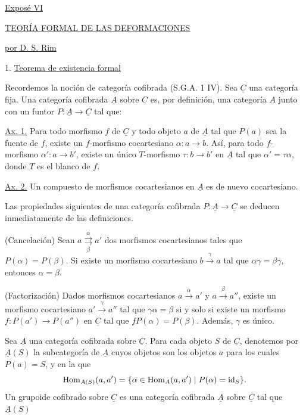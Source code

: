 
\begin{center}
\underline{Expos\'e VI}

\vspace{1em}
\underline{\underline{TEORÍA FORMAL DE LAS DEFORMACIONES}}

\vspace{1em}
\underline{por D. S. Rim}
\end{center}

1. \underline{Teorema de existencia formal}

Recordemos la noción de categoría cofibrada (S.G.A. 1 IV). Sea
$\underline C$ una categoría fija. Una categoría cofibrada $\underline A$
sobre $\underline C$ es, por definición, una categoría $\underline A$
junto con un funtor $P:\underline A\longrightarrow\underline C$ tal que:

\underline{Ax. 1.} Para todo morfismo $f$ de $\underline C$ y todo objeto
$a$ de $\underline A$ tal que $P(a)$ sea la fuente de $f$, existe un
$f$-morfismo cocartesiano $\alpha:a\longrightarrow b$. Así, para todo
$f$-morfismo $\alpha':a\longrightarrow b'$, existe un único
$T$-morfismo $\tau:b\longrightarrow b'$ en $\underline A$ tal que
$\alpha'=\tau\alpha$, donde $T$ es el blanco de $f$.

\underline{Ax. 2.} Un compuesto de morfismos cocartesianos en
$\underline A$ es de nuevo cocartesiano.

Las propiedades siguientes de una categoría cofibrada
$P:\underline A\longrightarrow\underline C$ se deducen inmediatamente de
las definiciones.

(Cancelación) Sean
$a\overset{\alpha}{\underset{\beta}{\rightrightarrows}}a'$ dos morfismos
cocartesianos tales que $P(\alpha)=P(\beta)$. Si existe un morfismo
cocartesiano $b\xrightarrow{\gamma}a$ tal que
$\alpha\gamma=\beta\gamma$, entonces $\alpha=\beta$.

(Factorización) Dados morfismos cocartesianos
$a\xrightarrow{\alpha}a'$ y $a\xrightarrow{\beta}a''$, existe un
morfismo cocartesiano $a'\xrightarrow{\gamma}a''$ tal que
$\gamma\alpha=\beta$ si y solo si existe un morfismo
$f:P(a')\longrightarrow P(a'')$ en $\underline C$ tal que
$fP(\alpha)=P(\beta)$. Además, $\gamma$ es único.

Sea $\underline A$ una categoría cofibrada sobre $\underline C$. Para cada
objeto $S$ de $\underline C$, denotemos por $\underline A(S)$ la
subcategoría de $\underline A$ cuyos objetos son los objetos $a$ para los
cuales $P(a)=S$, y en la que
\[
 \operatorname{Hom}_{A(S)}(a,a')=
 \{\alpha\in\operatorname{Hom}_{A}(a,a')\mid P(\alpha)=\mathrm{id}_S\}.
\]
Un grupoide cofibrado sobre $\underline C$ es una categoría cofibrada
$\underline A$ sobre $\underline C$ tal que $\underline A(S)$

